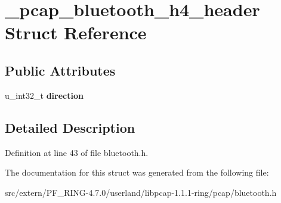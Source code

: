 \hypertarget{struct__pcap__bluetooth__h4__header}{
\section{\_\-pcap\_\-bluetooth\_\-h4\_\-header Struct Reference}
\label{struct__pcap__bluetooth__h4__header}
}
\subsection*{Public Attributes}
\begin{DoxyCompactItemize}
\item 
\hypertarget{struct__pcap__bluetooth__h4__header_ac7bcca365802c952b541347d35afabb0}{
u\_\-int32\_\-t {\bfseries direction}}
\label{struct__pcap__bluetooth__h4__header_ac7bcca365802c952b541347d35afabb0}

\end{DoxyCompactItemize}


\subsection{Detailed Description}


Definition at line 43 of file bluetooth.h.



The documentation for this struct was generated from the following file:\begin{DoxyCompactItemize}
\item 
src/extern/PF\_\-RING-\/4.7.0/userland/libpcap-\/1.1.1-\/ring/pcap/bluetooth.h\end{DoxyCompactItemize}
